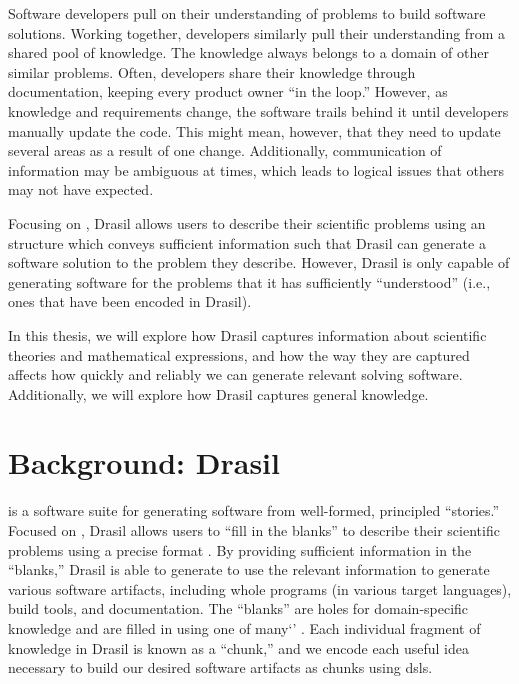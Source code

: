 Software developers pull on their understanding of problems to build software
solutions. Working together, developers similarly pull their understanding from
a shared pool of knowledge. The knowledge always belongs to a domain of other
similar problems. Often, developers share their knowledge through documentation,
keeping every product owner ``in the loop.'' However, as knowledge and
requirements change, the software trails behind it until developers manually
update the code. This might mean, however, that they need to update several
areas as a result of one change. Additionally, communication of information may
be ambiguous at times, which leads to logical issues that others may not have
expected.

Focusing on , Drasil allows users to describe their scientific problems
using an  structure which conveys sufficient information such that
Drasil can generate a software solution to the problem they describe. However,
Drasil is only capable of generating software for the problems that it has
sufficiently ``understood'' (i.e., ones that have been encoded in Drasil).

In this thesis, we will explore how Drasil captures information about scientific
theories and mathematical expressions, and how the way they are captured affects
how quickly and reliably we can generate relevant solving software.
Additionally, we will explore how Drasil captures general knowledge.

\section{Background: Drasil}
\label{chap:introduction:sec:background}

 is a software suite
for generating software from well-formed, principled ``stories.'' Focused on
, Drasil allows users to ``fill in the blanks'' to describe their
scientific problems using a precise  format \cite{SmithAndLai2005}. By
providing sufficient information in the ``blanks,'' Drasil is able to generate
to use the relevant information to generate various software artifacts,
including whole programs (in various target languages), build tools, and
documentation. The ``blanks'' are holes for domain-specific knowledge and are
filled in using one of many`' . Each individual fragment of knowledge
in Drasil is known as a ``chunk,'' and we encode each useful idea necessary to
build our desired software artifacts as chunks using \acsp{dsl}.

